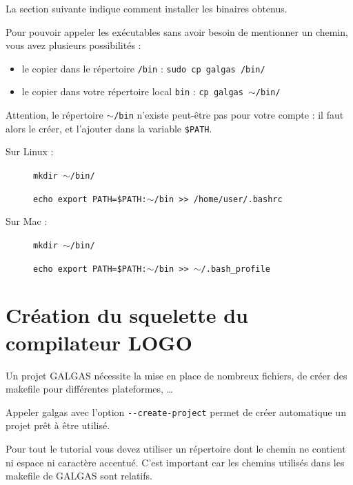 La section suivante indique comment installer les binaires obtenus.



Pour pouvoir appeler les exécutables sans avoir besoin de mentionner un chemin, vous avez plusieurs possibilités :
\begin{itemize}
  \item le copier dans le répertoire \texttt{/bin} :  \texttt{sudo cp galgas /bin/}
  \item le copier dans votre répertoire local \texttt{bin} : \texttt{cp galgas $\sim$/bin/}
\end{itemize}

Attention, le répertoire \texttt{$\sim$/bin} n'existe peut-être pas pour votre compte : il faut alors le créer, et l'ajouter dans la variable \texttt{\$PATH}.

Sur Linux :
\begin{description}
  \item[ ] \texttt{mkdir $\sim$/bin/}
  \item[ ] \texttt{echo \textquotesingle export~PATH=\$PATH:$\sim$/bin\textquotesingle~\textgreater{}\textgreater~/home/user/.bashrc}
\end{description}

Sur Mac :
\begin{description}
  \item[ ] \texttt{mkdir $\sim$/bin/}
  \item[ ] \texttt{echo \textquotesingle export~PATH=\$PATH:$\sim$/bin\textquotesingle~\textgreater{}\textgreater~$\sim$/.bash\_profile}
\end{description}













\section{Création du squelette du compilateur LOGO}

Un projet GALGAS nécessite la mise en place de nombreux fichiers, de créer des makefile pour différentes plateformes, … 

Appeler galgas avec l'option \texttt{-{}-create-project} permet de créer automatique un projet prêt à être utilisé.

Pour tout le tutorial vous devez utiliser un répertoire dont le chemin ne contient ni espace ni caractère accentué. C'est important car les chemins utilisés dans les makefile de GALGAS sont relatifs.

